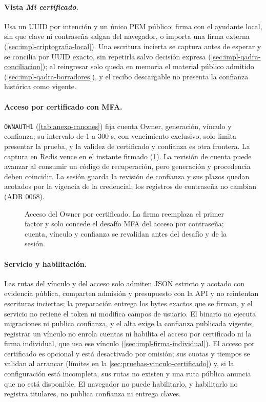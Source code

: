 \paragraph{Vista \emph{Mi certificado}.} Usa un UUID por intención y un único PEM público; firma con el ayudante local, sin que clave ni contraseña salgan del navegador, o importa una firma externa (\cref{sec:impl-criptografia-local}). Una escritura incierta se captura antes de esperar y se concilia por UUID exacto, sin repetirla salvo decisión expresa (\cref{sec:impl-qadra-conciliacion}); al reingresar solo queda en memoria el material público admitido (\cref{sec:impl-qadra-borradores}), y el recibo descargable no presenta la confianza histórica como vigente.

\paragraph{Acceso por certificado con MFA.} \texttt{OWNAUTH1} (\cref{tab:anexo-canones}) fija cuenta Owner, generación, vínculo y confianza; su intervalo de 1 a 300 s, con vencimiento exclusivo, solo limita presentar la prueba, y la validez de certificado y confianza es otra frontera. La captura en Redis vence en el instante firmado (\cref{fig:impl-acceso-certificado}). La revisión de cuenta puede avanzar al consumir un código de recuperación, pero generación y procedencia deben coincidir. La sesión guarda la revisión de confianza y sus plazos quedan acotados por la vigencia de la credencial; los registros de contraseña no cambian (ADR 0068).

\begin{figure}[!htb]
  \centering
  
  \caption{Acceso del Owner por certificado. La firma reemplaza el primer factor y solo concede el desafío MFA del acceso por contraseña; cuenta, vínculo y confianza se revalidan antes del desafío y de la sesión.}
  \label{fig:impl-acceso-certificado}
\end{figure}

\paragraph{Servicio y habilitación.} Las rutas del vínculo y del acceso solo admiten JSON estricto y acotado con evidencia pública, comparten admisión y presupuesto con la API y no reintentan escrituras inciertas; la preparación entrega los bytes exactos que se firman, y el servicio no retiene el token ni modifica campos de usuario. El binario no ejecuta migraciones ni publica confianza, y el alta exige la confianza publicada vigente; registrar un vínculo no enrola cuentas ni habilita el acceso por certificado ni la firma individual, que usa ese vínculo (\cref{sec:impl-firma-individual}). El acceso por certificado es opcional y está desactivado por omisión; sus cuotas y tiempos se validan al arrancar (límites en la \cref{sec:pruebas-vinculo-certificado}) y, si la configuración está incompleta, sus rutas no existen y una ruta pública anuncia que no está disponible. El navegador no puede habilitarlo, y habilitarlo no registra titulares, no publica confianza ni entrega claves.

